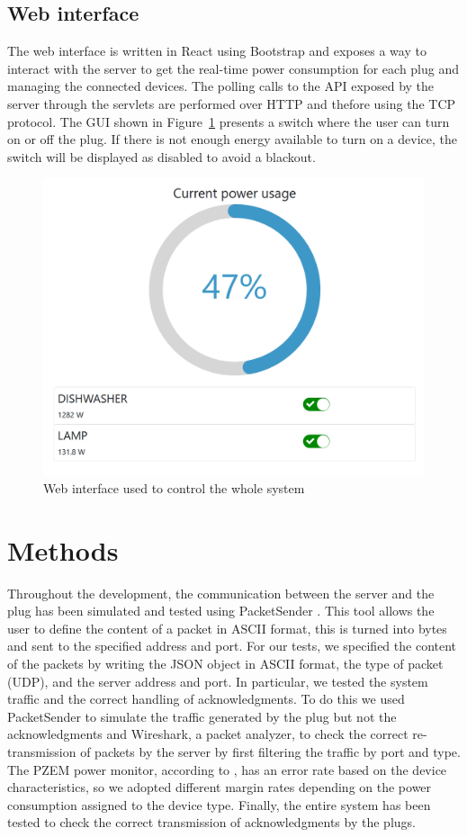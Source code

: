 \documentclass[conference]{IEEEtran}
\begin{document}
\subsection{Web interface}\label{WI}
The web interface is written in React using Bootstrap and exposes a way to interact with the server to get the real-time power consumption for each plug and managing the connected devices. The polling calls to the API exposed by the server through the servlets are performed over HTTP and thefore using the TCP protocol. The GUI shown in Figure~\ref{fig:simulatedwebapp} presents a switch where the user can turn on or off the plug. If there is not enough energy available to turn on a device, the switch will be displayed as disabled to avoid a blackout.
\begin{figure}[htbp]
	\centering
	\includegraphics[width=0.7\linewidth]{assets/simulated_webapp}
	\caption{Web interface used to control the whole system}
	\label{fig:simulatedwebapp}
\end{figure}

\section{Methods}
Throughout the development, the communication between the server and the plug has been simulated and tested using PacketSender \cite{packetsender}. This tool allows the user to define the content of a packet in ASCII format, this is turned into bytes and sent to the specified address and port. For our tests, we specified the content of the packets by writing the JSON object in ASCII format, the type of packet (UDP), and the server address and port. In particular, we tested the system traffic and the correct handling of acknowledgments. To do this we used PacketSender to simulate the traffic generated by the plug but not the acknowledgments and Wireshark, a packet analyzer, to check the correct re-transmission of packets by the server by first filtering the traffic by port and type. The PZEM power monitor, according to \cite{9264926}, has an error rate based on the device characteristics, so we adopted different margin rates depending on the power consumption assigned to the device type. Finally, the entire system has been tested to check the correct transmission of acknowledgments by the plugs.
\end{document}
